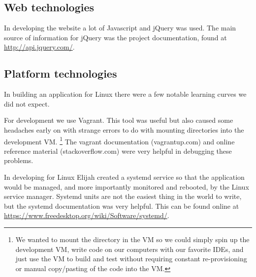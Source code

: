 \subsection{Web technologies}

In developing the website a lot of Javascript and jQuery was used.
The main source of information for jQuery was the project documentation, found at \url{http://api.jquery.com/}.

\subsection{Platform technologies}

In building an application for Linux there were a few notable learning curves we did not expect.

For development we use Vagrant.
This tool was useful but also caused some headaches early on with strange errors to do with mounting directories into the development VM.
\footnote{We wanted to mount the directory in the VM so we could simply spin up the development VM, write code on our computers with our favorite IDEs, and just use the VM to build and test without requiring constant re-provisioning or manual copy/pasting of the code into the VM.}
The vagrant documentation (vagrantup.com) and online reference material (stackoverflow.com) were very helpful in debugging these problems.

In developing for Linux Elijah created a systemd service so that the application would be managed, and more importantly monitored and rebooted, by the Linux service manager.
Systemd units are not the easiest thing in the world to write, but the systemd documentation was very helpful.
This can be found online at \\ \url{https://www.freedesktop.org/wiki/Software/systemd/}.
